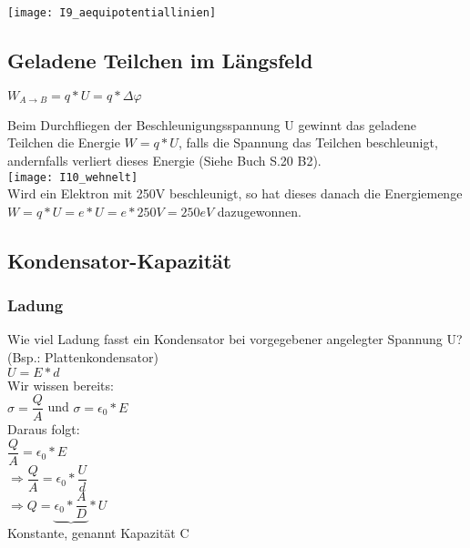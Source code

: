\documentclass[12pt]{scrartcl}
\begin{document}
\begin{flushleft}
			\texttt{[image: I9\_aequipotentiallinien]}
			\vspace{10mm}
			
		\subsection{Geladene Teilchen im Längsfeld}
		$ W_{A \rightarrow B} = q \ast U = q \ast \Delta \varphi $
		
		\vspace{2mm}
		Beim Durchfliegen der Beschleunigungsspannung U gewinnt das geladene Teilchen die Energie $ W = q \ast U $, falls die Spannung das Teilchen beschleunigt, andernfalls verliert dieses Energie (Siehe Buch S.20 B2).
		\vspace{2mm} \\
		\texttt{[image: I10\_wehnelt]}
		\vspace{2mm} \\
		Wird ein Elektron mit 250V beschleunigt, so hat dieses danach die Energiemenge $ W = q \ast U = e \ast U = e \ast 250V = 250 eV $ dazugewonnen.
		

		\subsection{Kondensator-Kapazität}
			\subsubsection{Ladung}
			Wie viel Ladung fasst ein Kondensator bei vorgegebener angelegter Spannung U? (Bsp.: Plattenkondensator)
			\vspace{2mm} \\
			$ U = E \ast d $
			\vspace{2mm} \\
			Wir wissen bereits:
			\vspace{2mm} \\
			$ \sigma = \dfrac{Q}{A} $ und $ \sigma = \epsilon_{0} \ast E $
			\vspace{2mm} \\
			Daraus folgt:
			\vspace{2mm} \\
			\hspace{5mm}$ \dfrac{Q}{A} = \epsilon_{0} \ast E $\\ \vspace{4mm}$ \Rightarrow \dfrac{Q}{A} = \epsilon_{0} \ast \dfrac{U}{d} $\\ \vspace{4mm}$ \Rightarrow Q = \underbrace{\epsilon_{0} \ast \dfrac{A}{D}} \ast U $ \\
			Konstante, genannt Kapazität C	
			

\end{flushleft}
\end{document}

